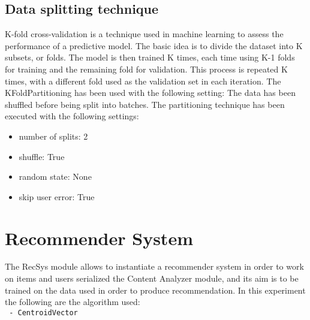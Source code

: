 \documentclass[11pt]{article}
\begin{document}
\hfill\break



\subsection{Data splitting technique}\label{subsec:partitioning}
K-fold cross-validation is a technique used in machine learning to assess the performance of a predictive model.
The basic idea is to divide the dataset into K subsets, or folds.
The model is then trained K times, each time using K-1 folds for training and the remaining fold for validation.
This process is repeated K times, with a different fold used as the validation set in each iteration.
\hfill\break
The KFoldPartitioning has been used with the following setting:
\hfill\break
The data has been shuffled before being split into batches.
The partitioning technique has been executed with the following settings:
\begin{itemize}
    \item number of splits: 2
    \item shuffle: True
    \item random state: None
    \item skip user error: True
\end{itemize}
\hfill\break

\hfill\break
\hfill\break


\section{Recommender System}\label{sec:recsys}
The RecSys module allows to instantiate a recommender system in order to work on items and users serialized
the Content Analyzer module, and its aim is to be trained on the data used in order to produce recommendation.
In this experiment the following are the algorithm used: \\


    \lstinline[style=verbatim-text]| - CentroidVector |  \\
\hfill\break
\hfill\break
\end{document}
